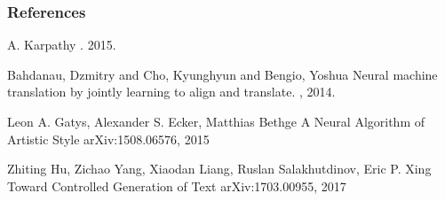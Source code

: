 \documentclass{beamer}
\begin{document}
\begin{frame}[allowframebreaks]
  \frametitle<presentation>{References}
    
  \begin{thebibliography}{10}
    

  \beamertemplatearticlebibitems
  
    A. Karpathy
    .
     2015.
 
    

    Bahdanau, Dzmitry and Cho, Kyunghyun and Bengio, Yoshua
    \newblock Neural machine translation by jointly learning to align and translate.
    , 2014.
    
    Leon A. Gatys, Alexander S. Ecker, Matthias Bethge
    \newblock A Neural Algorithm of Artistic Style
     arXiv:1508.06576, 2015
    
   Zhiting Hu, Zichao Yang, Xiaodan Liang, Ruslan Salakhutdinov, Eric P. Xing
    \newblock Toward Controlled Generation of Text
      	arXiv:1703.00955, 2017
  \end{thebibliography}


 \printbibliography
\end{frame}


% 
% 
\end{document}
